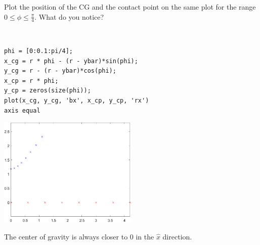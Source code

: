 Plot the position of the CG and the contact point on the same plot for the range $0 \leq \phi \leq \frac{\pi}{4}$. What do you notice?

\begin{solution} \
\begin{lstlisting}
phi = [0:0.1:pi/4];
x_cg = r * phi - (r - ybar)*sin(phi);
y_cg = r - (r - ybar)*cos(phi);
x_cp = r * phi;
y_cp = zeros(size(phi));
plot(x_cg, y_cg, 'bx', x_cp, y_cp, 'rx')
axis equal
\end{lstlisting}

\begin{center}
    \includegraphics[width=0.5\textwidth]{img/e3p3.png}
\end{center}

The center of gravity is always closer to $0$ in the $\hat{x}$ direction.
\end{solution}